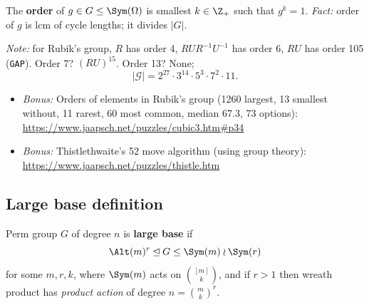 \documentclass[handout]{beamer}
\newcommand{\RC}{\mathcal{G}}
\begin{document}
\begin{slide}
    The \textbf{order} of $g \in G \leq \Sym(\Omega)$ is smallest $k \in \Z_+$ such that $g^k = 1$. \textit{Fact:} order of $g$ is lcm of cycle lengths; it divides $|G|$.

    \textit{Note:} for Rubik's group, $R$ has order 4, $RUR^{-1}U^{-1}$ has order 6, $RU$ has order 105 (\texttt{GAP}). Order 7? \pause $(RU)^{15}$. Order 13? \pause None;
    $$|\RC| = 2^{27} \cdot 3^{14} \cdot 5^3 \cdot 7^2 \cdot 11.$$

    \small
    \begin{itemize}
        \item \textit{Bonus:} Orders of elements in Rubik's group (1260 largest, 13 smallest without, 11 rarest, 60 most common, median 67.3, 73 options): \url{https://www.jaapsch.net/puzzles/cubic3.htm\#p34}
        \item \textit{Bonus:} Thistlethwaite's 52 move algorithm (using group theory): \url{https://www.jaapsch.net/puzzles/thistle.htm}
    \end{itemize}
\end{slide}

\subsection{Large base definition}

\begin{slide}
    \begin{definition}
        \vspace{0pt}
        Perm group $G$ of degree $n$ is \textbf{large base} if
        $$\Alt(m)^r \unlhd G \leq \Sym(m) \wr \Sym(r)$$
        for some $m,r,k$, where $\Sym(m)$ acts on $\binom{[m]}{k}$, and if $r > 1$ then wreath product has \textit{product action} of degree $n = \binom{m}{k}^r$.
    \end{definition}
\end{slide}


\end{document}
